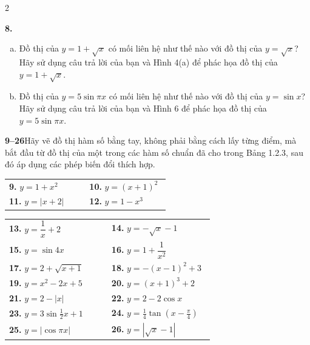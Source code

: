 \begin{multicols}{2}
\vspace{3pt}
\noindent{\color{stewartcyan!60}\rule{\linewidth}{0.6pt}}
\vspace{3pt}

\noindent\textbf{8.} 
\begin{enumerate}[(a),leftmargin=1.5em,itemsep=1pt,topsep=1pt]
\item Đồ thị của $y = 1 + \sqrt{x}$ có mối liên hệ như thế nào với đồ thị của $y = \sqrt{x}$? Hãy sử dụng câu trả lời của bạn và Hình 4(a) để phác họa đồ thị của $y = 1 + \sqrt{x}$.
\item Đồ thị của $y = 5\sin\pi x$ có mối liên hệ như thế nào với đồ thị của $y = \sin x$? Hãy sử dụng câu trả lời của bạn và Hình 6 để phác họa đồ thị của $y = 5\sin\pi x$.
\end{enumerate}

\vspace{3pt}
\noindent\textbf{\textsf{\color{stewartcyan}9--26}}\quad Hãy vẽ đồ thị hàm số bằng tay, không phải bằng cách lấy từng điểm, mà bắt đầu từ đồ thị của một trong các hàm số chuẩn đã cho trong Bảng 1.2.3, sau đó áp dụng các phép biến đổi thích hợp.
\vspace{3pt}

\noindent
\begin{tabular}{@{}p{0.48\linewidth}p{0.48\linewidth}@{}}
\textbf{9.} $y = 1 + x^2$ & \textbf{10.} $y = (x + 1)^2$ \\[2pt]
\textbf{11.} $y = |x + 2|$ & \textbf{12.} $y = 1 - x^3$
\end{tabular}

\columnbreak

\noindent
\begin{tabular}{@{}p{0.48\linewidth}p{0.48\linewidth}@{}}
\textbf{13.} $y = \dfrac{1}{x} + 2$ & \textbf{14.} $y = -\sqrt{x} - 1$ \\[2pt]
\textbf{15.} $y = \sin 4x$ & \textbf{16.} $y = 1 + \dfrac{1}{x^2}$ \\[2pt]
\textbf{17.} $y = 2 + \sqrt{x + 1}$ & \textbf{18.} $y = -(x - 1)^2 + 3$ \\[2pt]
\textbf{19.} $y = x^2 - 2x + 5$ & \textbf{20.} $y = (x + 1)^3 + 2$ \\[2pt]
\textbf{21.} $y = 2 - |x|$ & \textbf{22.} $y = 2 - 2\cos x$ \\[2pt]
\textbf{23.} $y = 3\sin\frac{1}{2}x + 1$ & \textbf{24.} $y = \frac{1}{4}\tan\left(x - \frac{\pi}{4}\right)$ \\[2pt]
\textbf{25.} $y = |\cos \pi x|$ & \textbf{26.} $y = |\sqrt{x} - 1|$
\end{tabular}


\end{multicols}
